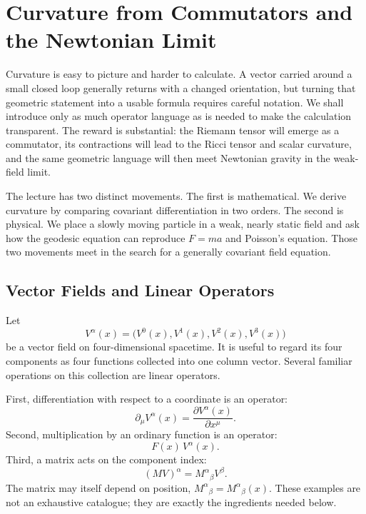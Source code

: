 \chapter{Curvature from Commutators and the Newtonian Limit}

Curvature is easy to picture and harder to calculate. A vector carried
around a small closed loop generally returns with a changed orientation,
but turning that geometric statement into a usable formula requires
careful notation. We shall introduce only as much operator language as is
needed to make the calculation transparent. The reward is substantial:
the Riemann tensor will emerge as a commutator, its contractions will lead
to the Ricci tensor and scalar curvature, and the same geometric language
will then meet Newtonian gravity in the weak-field limit.

The lecture has two distinct movements. The first is mathematical. We
derive curvature by comparing covariant differentiation in two orders.
The second is physical. We place a slowly moving particle in a weak,
nearly static field and ask how the geodesic equation can reproduce
\(F=ma\) and Poisson's equation. Those two movements meet in the search
for a generally covariant field equation.

\section{Vector Fields and Linear Operators}

Let
\begin{equation}
  V^\alpha(x)
  =
  \bigl(V^0(x),V^1(x),V^2(x),V^3(x)\bigr)
  \label{eq:l08-vector-field}
\end{equation}
be a vector field on four-dimensional spacetime. It is useful to regard
its four components as four functions collected into one column vector.
Several familiar operations on this collection are linear operators.

First, differentiation with respect to a coordinate is an operator:
\begin{equation}
  \partial_\mu V^\alpha(x)
  =
  \frac{\partial V^\alpha(x)}{\partial x^\mu}.
  \label{eq:l08-partial-operator}
\end{equation}
Second, multiplication by an ordinary function is an operator:
\begin{equation}
  F(x)\,V^\alpha(x).
  \label{eq:l08-function-operator}
\end{equation}
Third, a matrix acts on the component index:
\begin{equation}
  (MV)^\alpha=M^\alpha{}_\beta V^\beta.
  \label{eq:l08-matrix-operator}
\end{equation}
The matrix may itself depend on position,
\(M^\alpha{}_\beta=M^\alpha{}_\beta(x)\). These examples are not an
exhaustive catalogue; they are exactly the ingredients needed below.

